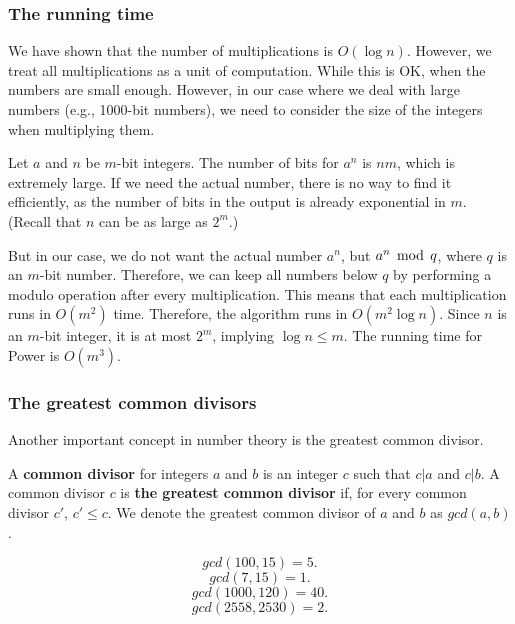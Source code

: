 \begin{frame}\frametitle{The running time}
  We have shown that the number of multiplications is $O(\log n)$.
  However, we treat all multiplications as a unit of computation.
  While this is OK, when the numbers are small enough.  However, in
  our case where we deal with large numbers (e.g., 1000-bit numbers),
  we need to consider the size of the integers when multiplying
  them.

  \vspace{0.08in}
  Let $a$ and $n$ be $m$-bit integers. The number of bits for $a^n$ is
  $nm$, which is extremely large.  If we need the actual number, there
  is no way to find it efficiently, as the number of bits in the
  output is already exponential in $m$.  (Recall that $n$ can be as
  large as $2^m$.)

  \vspace{0.08in}
  But in our case, we do not want the actual number $a^n$, but
  $a^n\,\bmod\, q$, where $q$ is an $m$-bit number.  Therefore, we can keep
  all numbers below $q$ by performing a modulo operation after every
  multiplication.  This means that each multiplication runs in
  $O(m^2)$ time.  Therefore, the algorithm runs in $O(m^2\log n)$.
  Since $n$ is an $m$-bit integer, it is at most $2^m$, implying $\log
  n\leq m$.  The running time for Power is $O(m^3)$.
\end{frame}

\begin{frame}\frametitle{The greatest common divisors}
  Another important concept in number theory is the greatest common
  divisor.

  A {\bf common divisor} for integers $a$ and $b$ is an integer $c$
  such that $c|a$ and $c|b$.  A common divisor $c$ is {\bf the
    greatest common divisor} if, for every common divisor $c'$,
  $c'\leq c$.  We denote the greatest common divisor of $a$ and $b$ as
  $gcd(a,b)$.

  \vspace{0.1in}
  \begin{tcolorbox}[title=Examples]
    \[ gcd(100,15) = 5. \] 
    \[ gcd(7,15) = 1. \] 
    \[ gcd(1000,120) = 40. \] 
    \[ gcd(2558,2530) = 2. \] 
  \end{tcolorbox}
\end{frame}

